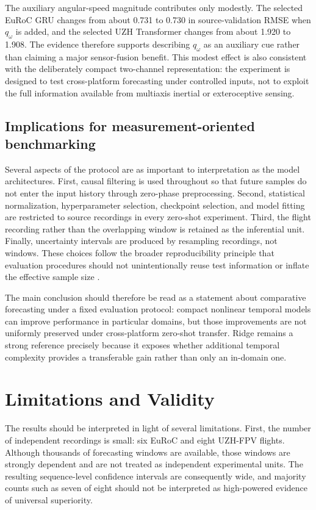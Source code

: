 \documentclass[preprint,12pt]{elsarticle}
\newcommand{\qw}{q_\omega}
\begin{document}
The auxiliary angular-speed magnitude contributes only modestly. The selected EuRoC GRU changes from about 0.731 to 0.730 in source-validation RMSE when $\qw$ is added, and the selected UZH Transformer changes from about 1.920 to 1.908. The evidence therefore supports describing $\qw$ as an auxiliary cue rather than claiming a major sensor-fusion benefit. This modest effect is also consistent with the deliberately compact two-channel representation: the experiment is designed to test cross-platform forecasting under controlled inputs, not to exploit the full information available from multiaxis inertial or exteroceptive sensing.

\subsection{Implications for measurement-oriented benchmarking}

Several aspects of the protocol are as important to interpretation as the model architectures. First, causal filtering is used throughout so that future samples do not enter the input history through zero-phase preprocessing. Second, statistical normalization, hyperparameter selection, checkpoint selection, and model fitting are restricted to source recordings in every zero-shot experiment. Third, the flight recording rather than the overlapping window is retained as the inferential unit. Finally, uncertainty intervals are produced by resampling recordings, not windows. These choices follow the broader reproducibility principle that evaluation procedures should not unintentionally reuse test information or inflate the effective sample size \cite{Varma2006CVBias,Benoit2025Reproducibility}.

The main conclusion should therefore be read as a statement about comparative forecasting under a fixed evaluation protocol: compact nonlinear temporal models can improve performance in particular domains, but those improvements are not uniformly preserved under cross-platform zero-shot transfer. Ridge remains a strong reference precisely because it exposes whether additional temporal complexity provides a transferable gain rather than only an in-domain one.

\section{Limitations and Validity}
\label{sec:limitations}

The results should be interpreted in light of several limitations. First, the number of independent recordings is small: six EuRoC and eight UZH-FPV flights. Although thousands of forecasting windows are available, those windows are strongly dependent and are not treated as independent experimental units. The resulting sequence-level confidence intervals are consequently wide, and majority counts such as seven of eight should not be interpreted as high-powered evidence of universal superiority.
\end{document}
